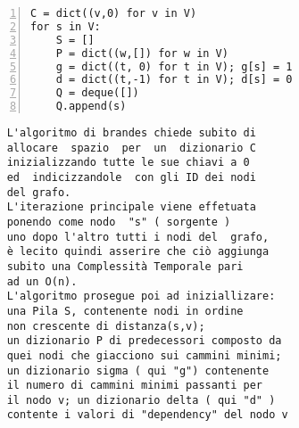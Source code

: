 \begin{minipage}{0.49\linewidth}
	\begin{Verbatim}[frame=topline,numbers=left,label=Codice,framesep=3mm]
C = dict((v,0) for v in V)
for s in V:
	S = []
	P = dict((w,[]) for w in V)
	g = dict((t, 0) for t in V); g[s] = 1
	d = dict((t,-1) for t in V); d[s] = 0
	Q = deque([])
	Q.append(s)
	\end{Verbatim}
\end{minipage}\hfill
\begin{minipage}{0.49\linewidth}
	\begin{Verbatim}
	L'algoritmo di brandes chiede subito di
	allocare  spazio  per  un  dizionario C 
	inizializzando tutte le sue chiavi a 0 
	ed  indicizzandole  con gli ID dei nodi 
	del grafo. 
	L'iterazione principale viene effetuata
	ponendo come nodo  "s" ( sorgente )
	uno dopo l'altro tutti i nodi del  grafo, 
	è lecito quindi asserire che ciò aggiunga 
	subito una Complessità Temporale pari 
	ad un O(n).
	L'algoritmo prosegue poi ad iniziallizare: 
	una Pila S, contenente nodi in ordine
	non crescente di distanza(s,v);
	un dizionario P di predecessori composto da 
	quei nodi che giacciono sui cammini minimi;
	un dizionario sigma ( qui "g") contenente
	il numero di cammini minimi passanti per 
	il nodo v; un dizionario delta ( qui "d" )
	contente i valori di "dependency" del nodo v
	\end{Verbatim}

\end{minipage}
\newline \newline